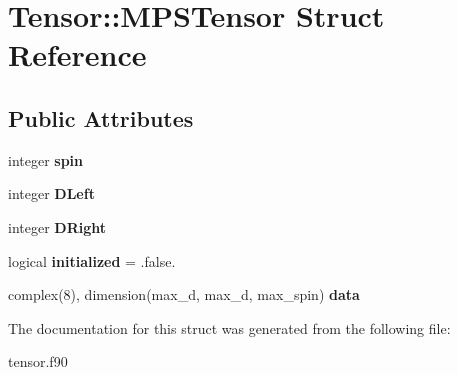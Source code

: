 \hypertarget{struct_tensor_1_1_m_p_s_tensor}{
\section{Tensor::MPSTensor Struct Reference}
\label{struct_tensor_1_1_m_p_s_tensor}
}
\subsection*{Public Attributes}
\begin{DoxyCompactItemize}
\item 
\hypertarget{struct_tensor_1_1_m_p_s_tensor_a21897997dadfd4fbcff8a92f9923cf30}{
integer {\bfseries spin}}
\label{struct_tensor_1_1_m_p_s_tensor_a21897997dadfd4fbcff8a92f9923cf30}

\item 
\hypertarget{struct_tensor_1_1_m_p_s_tensor_a21b97a6b9857af86a3ca5326b7af3867}{
integer {\bfseries DLeft}}
\label{struct_tensor_1_1_m_p_s_tensor_a21b97a6b9857af86a3ca5326b7af3867}

\item 
\hypertarget{struct_tensor_1_1_m_p_s_tensor_afad7375a54744b404acc8645fe8348e4}{
integer {\bfseries DRight}}
\label{struct_tensor_1_1_m_p_s_tensor_afad7375a54744b404acc8645fe8348e4}

\item 
\hypertarget{struct_tensor_1_1_m_p_s_tensor_a1bc76e1b30c6937c5c3ba72fc7b3e97e}{
logical {\bfseries initialized} = .false.}
\label{struct_tensor_1_1_m_p_s_tensor_a1bc76e1b30c6937c5c3ba72fc7b3e97e}

\item 
\hypertarget{struct_tensor_1_1_m_p_s_tensor_a8648424759046fe0a381150024c5cdeb}{
complex(8), dimension(max\_\-d, max\_\-d, max\_\-spin) {\bfseries data}}
\label{struct_tensor_1_1_m_p_s_tensor_a8648424759046fe0a381150024c5cdeb}

\end{DoxyCompactItemize}


The documentation for this struct was generated from the following file:\begin{DoxyCompactItemize}
\item 
tensor.f90\end{DoxyCompactItemize}
